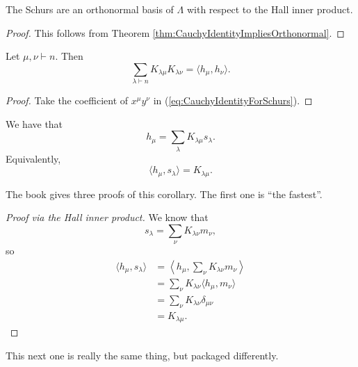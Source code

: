 \documentclass{article}
\begin{document}
\begin{corollary}
    The Schurs are an orthonormal basis of $\Lambda$ with respect to the Hall inner product.
\end{corollary}
\begin{proof}
    This follows from Theorem \ref{thm:CauchyIdentityImpliesOrthonormal}.
\end{proof}

\begin{corollary}
    Let $\mu,\nu \vdash n$. Then
    \[
        \sum_{\lambda \vdash n} K_{\lambda\mu}K_{\lambda\nu} = \langle h_\mu, h_\nu \rangle.
    \]
\end{corollary}

\begin{proof}
    Take the coefficient of $x^\mu y^\nu$ in (\ref{eq:CauchyIdentityForSchurs}).
\end{proof}

\begin{corollary}\label{thm:HToSIsKostka}
    We have that
    \[
        h_\mu = \sum_\lambda K_{\lambda\mu}s_\lambda.
    \]
    Equivalently,
    \[
        \langle h_\mu, s_\lambda \rangle = K_{\lambda\mu}.
    \]
\end{corollary}

The book gives three proofs of this corollary. The first one is ``the fastest''.

\begin{proof}[Proof via the Hall inner product]
    We know that
    \[
        s_\lambda = \sum_\nu K_{\lambda\nu} m_\nu,
    \]
    so 
    \begin{align*}
        \langle h_\mu, s_\lambda \rangle &= \left\langle h_\mu, \sum_\nu K_{\lambda\nu} m_\nu \right\rangle \\
                                         &=\sum_{\nu} K_{\lambda\nu} \langle h_\mu, m_\nu \rangle \\
                                         &=\sum_{\nu} K_{\lambda\nu} \delta_{\mu\nu} \\
                                         &= K_{\lambda\mu}.
    \end{align*}
\end{proof}

This next one is really the same thing, but packaged differently.
\end{document}
